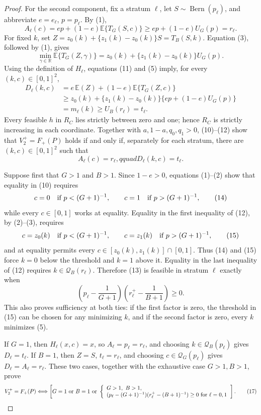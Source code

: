 \documentclass{article}
\begin{document}
\begin{proof}
For the second component, fix a stratum \(\ell\), let
\(S\sim\operatorname{Bern}(p_\ell)\), and abbreviate
\(e=e_\ell\), \(p=p_\ell\).  By (1),
\[
 A_\ell(c)=ep+(1-e)\mathbb E\{T_G(S,c)\}
 \geq ep+(1-e)U_G(p)=r_\ell.                                  \tag{10}
\]
For fixed \(k\), set \(Z=z_0(k)+\{z_1(k)-z_0(k)\}S=T_B(S,k)\).
Equation (3), followed by (1), gives
\[
 \min_{\gamma\in\mathbb R}\mathbb E\{T_G(Z,\gamma)\}
 =z_0(k)+\{z_1(k)-z_0(k)\}U_G(p).                              \tag{11}
\]
Using the definition of \(H_\ell\), equations (11) and (5) imply,
for every \((k,c)\in[0,1]^2\),
\[
 \begin{aligned}
 D_\ell(k,c)
 &=e\,\mathbb E(Z)+(1-e)\mathbb E\{T_G(Z,c)\}\\
 &\geq z_0(k)+\{z_1(k)-z_0(k)\}
        \{ep+(1-e)U_G(p)\}\\
 &=m_\ell(k)\geq U_B(r_\ell)=t_\ell.                         \tag{12}
 \end{aligned}
\]
Every feasible \(h\) in \(R_C\) lies strictly between zero and one;
hence \(R_C\) is strictly increasing in each coordinate.  Together
with \(a,1-a,q_0,q_1>0\), (10)--(12) show that
\(V_2^+=F_+(P)\) holds if and only if, separately for each stratum,
there are \((k,c)\in[0,1]^2\) such that
\[
 A_\ell(c)=r_\ell,qquad D_\ell(k,c)=t_\ell.                   \tag{13}
\]

Suppose first that \(G>1\) and \(B>1\).  Since \(1-e>0\), equations
(1)--(2) show that equality in (10) requires
\[
 c=0\quad\hbox{if }p<(G+1)^{-1},\qquad
 c=1\quad\hbox{if }p>(G+1)^{-1},                              \tag{14}
\]
while every \(c\in[0,1]\) works at equality.  Equality in the first
inequality of (12), by (2)--(3), requires
\[
 c=z_0(k)\quad\hbox{if }p<(G+1)^{-1},\qquad
 c=z_1(k)\quad\hbox{if }p>(G+1)^{-1},                          \tag{15}
\]
and at equality permits every \(c\in[z_0(k),z_1(k)]\cap[0,1]\).
Thus (14) and (15) force \(k=0\) below the threshold and \(k=1\)
above it.  Equality in the last inequality of (12) requires
\(k\in\mathcal Q_B(r_\ell)\).  Therefore (13) is feasible in stratum
\(\ell\) exactly when
\[
 \left(p_\ell-\frac1{G+1}\right)
 \left(r_\ell^+-\frac1{B+1}\right)\geq0.                     \tag{16}
\]
This also proves sufficiency at both ties: if the first factor is zero,
the threshold in (15) can be chosen for any minimizing \(k\), and if
the second factor is zero, every \(k\) minimizes (5).

If \(G=1\), then \(H_\ell(x,c)=x\), so
\(A_\ell=p_\ell=r_\ell\), and choosing
\(k\in\mathcal Q_B(p_\ell)\) gives \(D_\ell=t_\ell\).  If \(B=1\),
then \(Z=S\), \(t_\ell=r_\ell\), and choosing
\(c\in\mathcal Q_G(p_\ell)\) gives
\(D_\ell=A_\ell=r_\ell\).  These two cases, together with the
exhaustive case \(G>1,B>1\), prove
\[
 V_2^+=F_+(P)
 \Longleftrightarrow
 \left[
 G=1\ \hbox{or}\ B=1\ \hbox{or}\
 \left\{
 \begin{array}{l}
 G>1,\ B>1,\\
 (p_\ell-(G+1)^{-1})(r_\ell^+-(B+1)^{-1})\geq0
 \text{ for }\ell=0,1
 \end{array}
 \right.
 \right].                                                     \tag{17}
\]


\end{proof}
\end{document}
